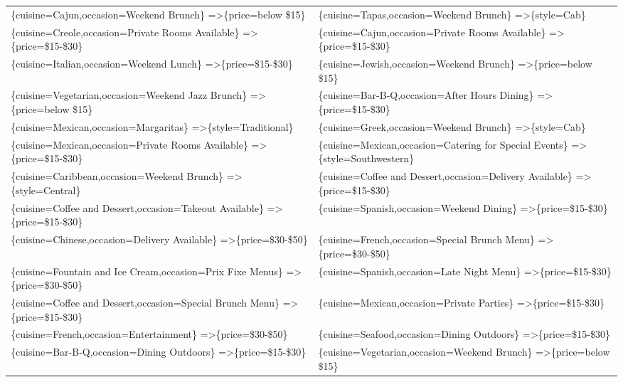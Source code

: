 \documentclass[letterpaper,10pt]{article}
\begin{document}
\begin{appendices}
\begin{table}[h]
\begin{adjustbox}{max width=\textwidth}
\begin{tabular}{ll}
\{cuisine=Cajun,occasion=Weekend Brunch\} =\textgreater \{price=below \$15\} & \{cuisine=Tapas,occasion=Weekend Brunch\} =\textgreater \{style=Cab\} \\ 
\{cuisine=Creole,occasion=Private Rooms Available\} =\textgreater \{price=\$15-\$30\} & \{cuisine=Cajun,occasion=Private Rooms Available\} =\textgreater \{price=\$15-\$30\} \\ 
\{cuisine=Italian,occasion=Weekend Lunch\} =\textgreater \{price=\$15-\$30\} & \{cuisine=Jewish,occasion=Weekend Brunch\} =\textgreater \{price=below \$15\} \\ 
\{cuisine=Vegetarian,occasion=Weekend Jazz Brunch\} =\textgreater \{price=below \$15\} & \{cuisine=Bar-B-Q,occasion=After Hours Dining\} =\textgreater \{price=\$15-\$30\} \\ 
\{cuisine=Mexican,occasion=Margaritas\} =\textgreater \{style=Traditional\} & \{cuisine=Greek,occasion=Weekend Brunch\} =\textgreater \{style=Cab\} \\ 
\{cuisine=Mexican,occasion=Private Rooms Available\} =\textgreater \{price=\$15-\$30\} & \{cuisine=Mexican,occasion=Catering for Special Events\} =\textgreater \{style=Southwestern\} \\ 
\{cuisine=Caribbean,occasion=Weekend Brunch\} =\textgreater \{style=Central\} & \{cuisine=Coffee and Dessert,occasion=Delivery Available\} =\textgreater \{price=\$15-\$30\} \\ 
\{cuisine=Coffee and Dessert,occasion=Takeout Available\} =\textgreater \{price=\$15-\$30\} & \{cuisine=Spanish,occasion=Weekend Dining\} =\textgreater \{price=\$15-\$30\} \\ 
\{cuisine=Chinese,occasion=Delivery Available\} =\textgreater \{price=\$30-\$50\} & \{cuisine=French,occasion=Special Brunch Menu\} =\textgreater \{price=\$30-\$50\} \\ 
\{cuisine=Fountain and Ice Cream,occasion=Prix Fixe Menus\} =\textgreater \{price=\$30-\$50\} & \{cuisine=Spanish,occasion=Late Night Menu\} =\textgreater \{price=\$15-\$30\} \\ 
\{cuisine=Coffee and Dessert,occasion=Special Brunch Menu\} =\textgreater \{price=\$15-\$30\} & \{cuisine=Mexican,occasion=Private Parties\} =\textgreater \{price=\$15-\$30\} \\ 
\{cuisine=French,occasion=Entertainment\} =\textgreater \{price=\$30-\$50\} & \{cuisine=Seafood,occasion=Dining Outdoors\} =\textgreater \{price=\$15-\$30\} \\ 
\{cuisine=Bar-B-Q,occasion=Dining Outdoors\} =\textgreater \{price=\$15-\$30\} & \{cuisine=Vegetarian,occasion=Weekend Brunch\} =\textgreater \{price=below \$15\} \\ 
\end{tabular}
\end{adjustbox}
\end{table}
\clearpage
\newpage

\end{appendices}
\end{document}
